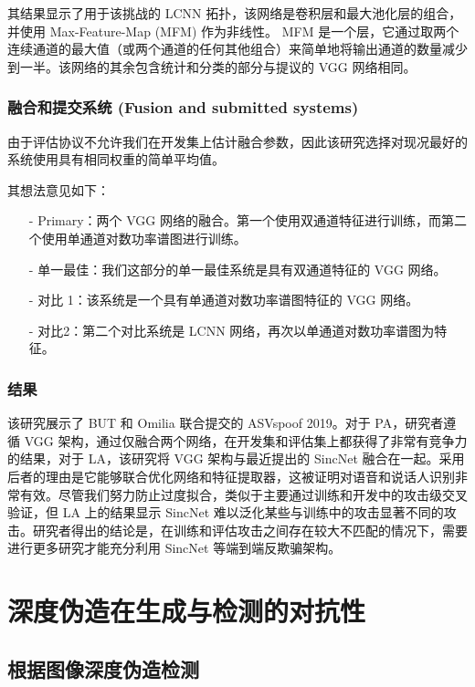 其结果显示了用于该挑战的 LCNN 拓扑，该网络是卷积层和最大池化层的组合，并使用 Max-Feature-Map (MFM) 作为非线性。 MFM 是一个层，它通过取两个连续通道的最大值（或两个通道的任何其他组合）来简单地将输出通道的数量减少到一半。该网络的其余包含统计和分类的部分与提议的 VGG 网络相同。

\subsubsection{融合和提交系统 (Fusion and submitted systems)}

由于评估协议不允许我们在开发集上估计融合参数，因此该研究选择对现况最好的系统使用具有相同权重的简单平均值。

其想法意见如下：

\begin{itemize}
\item [-] Primary：两个 VGG 网络的融合。第一个使用双通道特征进行训练，而第二个使用单通道对数功率谱图进行训练。
\item [-] 单一最佳：我们这部分的单一最佳系统是具有双通道特征的 VGG 网络。
\item [-] 对比 1：该系统是一个具有单通道对数功率谱图特征的 VGG 网络。
\item [-] 对比2：第二个对比系统是 LCNN 网络，再次以单通道对数功率谱图为特征。
\end{itemize}

\subsubsection{结果}

该研究展示了 BUT 和 Omilia 联合提交的 ASVspoof 2019。对于 PA，研究者遵循 VGG 架构，通过仅融合两个网络，在开发集和评估集上都获得了非常有竞争力的结果，对于 LA，该研究将 VGG 架构与最近提出的 SincNet 融合在一起。采用后者的理由是它能够联合优化网络和特征提取器，这被证明对语音和说话人识别非常有效。尽管我们努力防止过度拟合，类似于主要通过训练和开发中的攻击级交叉验证，但 LA 上的结果显示 SincNet 难以泛化某些与训练中的攻击显著不同的攻击。研究者得出的结论是，在训练和评估攻击之间存在较大不匹配的情况下，需要进行更多研究才能充分利用 SincNet 等端到端反欺骗架构。

\section{深度伪造在生成与检测的对抗性}

\subsection{根据图像深度伪造检测}

